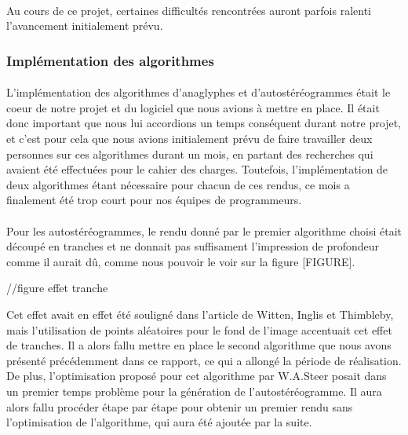 \paragraph{}
Au cours de ce projet, certaines difficultés rencontrées auront parfois ralenti l'avancement initialement prévu.

\subsubsection{Implémentation des algorithmes}
\paragraph{}
L'implémentation des algorithmes d'anaglyphes et d'autostéréogrammes était le coeur de notre projet et du logiciel que nous avions à mettre en place. Il était donc important que nous lui accordions un temps conséquent durant notre projet, et c'est pour cela que nous avions initialement prévu de faire travailler deux personnes sur ces algorithmes durant un mois, en partant des recherches qui avaient été effectuées pour le cahier des charges. Toutefois, l'implémentation de deux algorithmes étant nécessaire pour chacun de ces rendus, ce mois a finalement été trop court pour nos équipes de programmeurs.

\paragraph{}
Pour les autostéréogrammes, le rendu donné par le premier algorithme choisi était découpé en tranches et ne donnait pas suffisament l'impression de profondeur comme il aurait dû, comme nous pouvoir le voir sur la figure [FIGURE].

//figure effet tranche

Cet effet avait en effet été souligné dans l'article de Witten, Inglis et Thimbleby, mais l'utilisation de points aléatoires pour le fond de l'image accentuait cet effet de tranches. 
Il a alors fallu mettre en place le second algorithme que nous avons présenté précédemment dans ce rapport, ce qui a allongé la période de réalisation. De plus, l'optimisation proposé pour cet algorithme par W.A.Steer posait dans un premier temps problème pour la génération de l'autostéréogramme. Il aura alors fallu procéder étape par étape pour obtenir un premier rendu sans l'optimisation de l'algorithme, qui aura été ajoutée par la suite.

